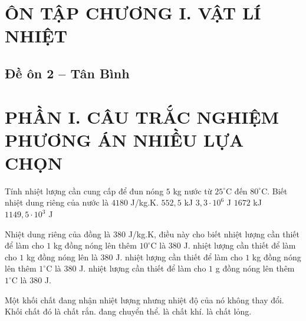 
\section{ÔN TẬP CHƯƠNG I. VẬT LÍ NHIỆT}
\subsection{Đề ôn 2 -- Tân Bình}

\section*{PHẦN I. CÂU TRẮC NGHIỆM PHƯƠNG ÁN NHIỀU LỰA CHỌN}

\begin{ex}
Tính nhiệt lượng cần cung cấp để đun nóng $5$ kg nước từ $25^\circ\mathrm{C}$ đến $80^\circ\mathrm{C}$. Biết nhiệt dung riêng của nước là $4180$ J/kg.K.
\choice
{$552,5$ kJ}
{$3,3\cdot10^6$ J}
{$1672$ kJ}
{\True $1149,5\cdot10^3$ J}
\loigiai{\[Q=mc\Delta T=5\cdot4180\cdot(80-25)=1\,149\,500\ \mathrm{J}.\]}
\end{ex}

\begin{ex}
Nhiệt dung riêng của đồng là $380$ J/kg.K, điều này cho biết
\choice
{nhiệt lượng cần thiết để làm cho $1$ kg đồng nóng lên thêm $10^\circ\mathrm{C}$ là $380$ J.}
{nhiệt lượng cần thiết để làm cho $1$ kg đồng nóng lên là $380$ J.}
{\True nhiệt lượng cần thiết để làm cho $1$ kg đồng nóng lên thêm $1^\circ\mathrm{C}$ là $380$ J.}
{nhiệt lượng cần thiết để làm cho $1$ g đồng nóng lên thêm $1^\circ\mathrm{C}$ là $380$ J.}
\end{ex}

\begin{ex}
Một khối chất đang nhận nhiệt lượng nhưng nhiệt độ của nó không thay đổi. Khối chất đó
\choice
{là chất rắn.}
{\True đang chuyển thể.}
{là chất khí.}
{là chất lỏng.}
\end{ex}


